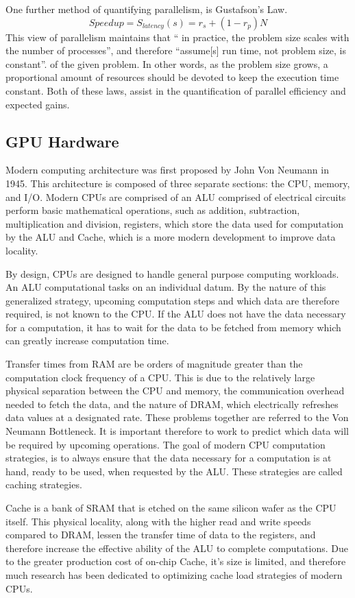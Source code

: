 One further method of quantifying parallelism, is Gustafson's Law\cite{Gustafson}.
%
\begin{equation}
  \tag{Gustofson's Law}
  Speedup = S_{latency}(s) = r_{s} + (1 - r_{p})N
\end{equation}
%
This view of parallelism maintains that `` in practice, the problem
size scales with the number of processes'', and therefore
``assume[s] run time, not problem size, is constant''.
of the given problem. In other words, as the problem size grows, a proportional
amount of resources should be devoted to keep the execution time constant.
Both of these laws, assist in the quantification of parallel efficiency and
expected gains.

\subsection{GPU Hardware}

Modern computing architecture was first proposed by John Von Neumann in 1945.
This architecture is composed of three separate sections: the \Gls{CPU}, memory, and \Gls{I/O}.
Modern \Glspl{CPU} are comprised of an \Gls{ALU} comprised of electrical circuits
perform basic mathematical operations, such as addition, subtraction, multiplication and division,
registers, which store the data used for computation by the ALU and Cache, which is a more modern development to improve data locality.
\par
By design, \Glspl{CPU} are designed
to handle general purpose computing workloads.
An \Gls{ALU} computational
tasks on an individual datum. By the nature of this
generalized strategy, upcoming computation steps and which data are therefore required,
is not known to the CPU. If the ALU does not have the data necessary for a computation,
it has to wait for the data to be fetched from memory which can greatly increase computation time.
\par
Transfer times from \Gls{RAM}
are be orders of magnitude greater than the computation clock frequency of
a CPU.  This is due to the relatively large physical separation between the CPU and memory,
 the communication overhead needed to fetch the data, and
the nature of \Gls{DRAM}, which electrically refreshes data values at a designated rate.
These problems together are referred to the Von Neumann Bottleneck\cite{Backus}.
It is important therefore to work to predict which data will be required by upcoming operations.
The goal of modern CPU computation strategies, is to always ensure that the data
necessary for a computation is at hand, ready to be used, when requested by the \Gls{ALU}.
These strategies are called caching strategies.
\par
Cache is a bank of \Gls{SRAM}
that is etched on the same silicon wafer as the CPU itself.  This physical locality,
along with the higher read and write speeds compared to DRAM, lessen the transfer
time of data to the registers, and therefore increase the effective ability of the \Gls{ALU} to complete computations.
Due to the greater production cost of on-chip Cache, it's size is limited, and therefore
much research has been dedicated to optimizing cache load strategies of modern CPUs. %
\par

